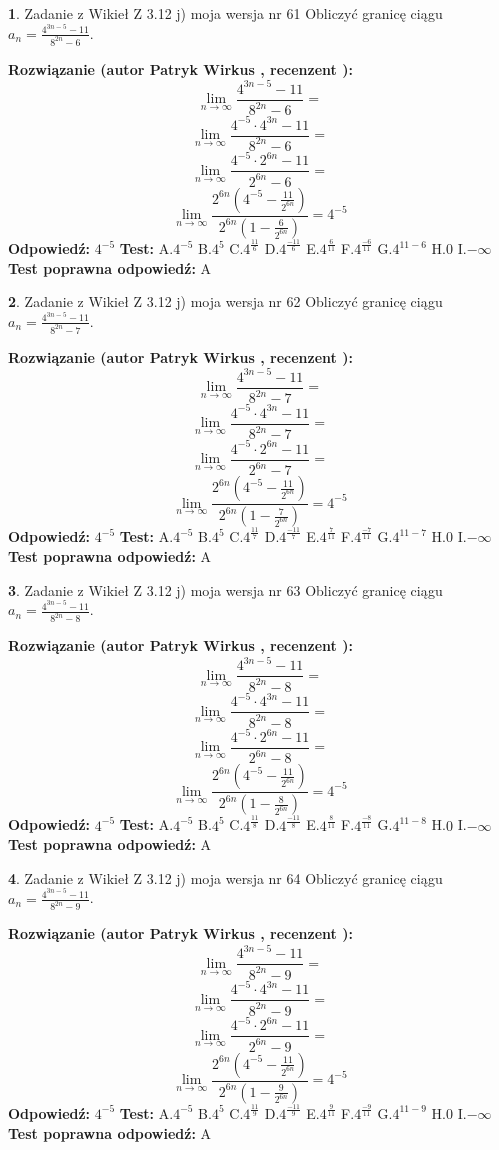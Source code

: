 \documentclass[12pt, a4paper]{article}
\theoremstyle{definition} %
\newtheorem{zad}{}
\newcommand{\zadStart}[1]{\begin{zad}#1\newline}
\newcommand{\zadStop}{\end{zad}}
\newcommand{\rozwStart}[2]{\noindent \textbf{Rozwiązanie (autor #1 , recenzent #2): }\newline}
\newcommand{\rozwStop}{\newline}
\newcommand{\odpStart}{\noindent \textbf{Odpowiedź:}\newline}
\newcommand{\odpStop}{\newline}
\newcommand{\testStart}{\noindent \textbf{Test:}\newline}
\newcommand{\testStop}{\newline}
\newcommand{\kluczStart}{\noindent \textbf{Test poprawna odpowiedź:}\newline}
\newcommand{\kluczStop}{\newline}
\begin{document}
\zadStart{Zadanie z Wikieł Z 3.12 j) moja wersja nr 61}
Obliczyć granicę ciągu $a_{n}=\frac{4^{3n-5}-11}{8^{2n}-6}$.
\zadStop
\rozwStart{Patryk Wirkus}{}
$$\lim\limits_{n\to\infty}\frac{4^{3n-5}-11}{8^{2n}-6}=$$
$$\lim\limits_{n\to\infty}\frac{4^{-5} \cdot 4^{3n}-11}{8^{2n}-6}=$$
$$\lim\limits_{n\to\infty}\frac{4^{-5} \cdot 2^{6n}-11}{2^{6n}-6}=$$
$$\lim\limits_{n\to\infty}\frac{2^{6n}(4^{-5} - \frac{11}{2^{6n}})}{2^{6n}(1-\frac{6}{2^{6n}})}= 4^{-5}$$
\rozwStop
\odpStart
$4^{-5}$
\odpStop
\testStart
A.$4^{-5}$
B.$4^{5}$
C.$4^{\frac{11}{6}}$
D.$4^{\frac{-11}{6}}$
E.$4^{\frac{6}{11}}$
F.$4^{\frac{-6}{11}}$
G.$4^{11-6}$
H.$0$
I.$-\infty$
\testStop
\kluczStart
A
\kluczStop



\zadStart{Zadanie z Wikieł Z 3.12 j) moja wersja nr 62}
Obliczyć granicę ciągu $a_{n}=\frac{4^{3n-5}-11}{8^{2n}-7}$.
\zadStop
\rozwStart{Patryk Wirkus}{}
$$\lim\limits_{n\to\infty}\frac{4^{3n-5}-11}{8^{2n}-7}=$$
$$\lim\limits_{n\to\infty}\frac{4^{-5} \cdot 4^{3n}-11}{8^{2n}-7}=$$
$$\lim\limits_{n\to\infty}\frac{4^{-5} \cdot 2^{6n}-11}{2^{6n}-7}=$$
$$\lim\limits_{n\to\infty}\frac{2^{6n}(4^{-5} - \frac{11}{2^{6n}})}{2^{6n}(1-\frac{7}{2^{6n}})}= 4^{-5}$$
\rozwStop
\odpStart
$4^{-5}$
\odpStop
\testStart
A.$4^{-5}$
B.$4^{5}$
C.$4^{\frac{11}{7}}$
D.$4^{\frac{-11}{7}}$
E.$4^{\frac{7}{11}}$
F.$4^{\frac{-7}{11}}$
G.$4^{11-7}$
H.$0$
I.$-\infty$
\testStop
\kluczStart
A
\kluczStop



\zadStart{Zadanie z Wikieł Z 3.12 j) moja wersja nr 63}
Obliczyć granicę ciągu $a_{n}=\frac{4^{3n-5}-11}{8^{2n}-8}$.
\zadStop
\rozwStart{Patryk Wirkus}{}
$$\lim\limits_{n\to\infty}\frac{4^{3n-5}-11}{8^{2n}-8}=$$
$$\lim\limits_{n\to\infty}\frac{4^{-5} \cdot 4^{3n}-11}{8^{2n}-8}=$$
$$\lim\limits_{n\to\infty}\frac{4^{-5} \cdot 2^{6n}-11}{2^{6n}-8}=$$
$$\lim\limits_{n\to\infty}\frac{2^{6n}(4^{-5} - \frac{11}{2^{6n}})}{2^{6n}(1-\frac{8}{2^{6n}})}= 4^{-5}$$
\rozwStop
\odpStart
$4^{-5}$
\odpStop
\testStart
A.$4^{-5}$
B.$4^{5}$
C.$4^{\frac{11}{8}}$
D.$4^{\frac{-11}{8}}$
E.$4^{\frac{8}{11}}$
F.$4^{\frac{-8}{11}}$
G.$4^{11-8}$
H.$0$
I.$-\infty$
\testStop
\kluczStart
A
\kluczStop



\zadStart{Zadanie z Wikieł Z 3.12 j) moja wersja nr 64}
Obliczyć granicę ciągu $a_{n}=\frac{4^{3n-5}-11}{8^{2n}-9}$.
\zadStop
\rozwStart{Patryk Wirkus}{}
$$\lim\limits_{n\to\infty}\frac{4^{3n-5}-11}{8^{2n}-9}=$$
$$\lim\limits_{n\to\infty}\frac{4^{-5} \cdot 4^{3n}-11}{8^{2n}-9}=$$
$$\lim\limits_{n\to\infty}\frac{4^{-5} \cdot 2^{6n}-11}{2^{6n}-9}=$$
$$\lim\limits_{n\to\infty}\frac{2^{6n}(4^{-5} - \frac{11}{2^{6n}})}{2^{6n}(1-\frac{9}{2^{6n}})}= 4^{-5}$$
\rozwStop
\odpStart
$4^{-5}$
\odpStop
\testStart
A.$4^{-5}$
B.$4^{5}$
C.$4^{\frac{11}{9}}$
D.$4^{\frac{-11}{9}}$
E.$4^{\frac{9}{11}}$
F.$4^{\frac{-9}{11}}$
G.$4^{11-9}$
H.$0$
I.$-\infty$
\testStop
\kluczStart
A
\kluczStop
\end{document}
